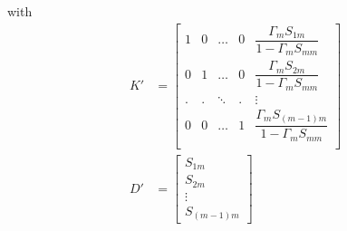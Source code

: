 with
\begin{align}
K' &=
\begin{bmatrix}
1 & 0 & \ldots & 0 & \dfrac{\Gamma_m S_{1m}}{1 - \Gamma_m S_{mm}}\\
0 & 1 & \ldots & 0 & \dfrac{\Gamma_m S_{2m}}{1 - \Gamma_m S_{mm}}\\
. & . & \ddots & . & \vdots\\
0 & 0 & \ldots & 1 & \dfrac{\Gamma_m S_{(m-1)m}}{1 - \Gamma_m S_{mm}}\\
\end{bmatrix}\\
D' &=
\begin{bmatrix}
S_{1m}\\
S_{2m}\\
\vdots\\
S_{(m-1)m}
\end{bmatrix}
\end{align}
